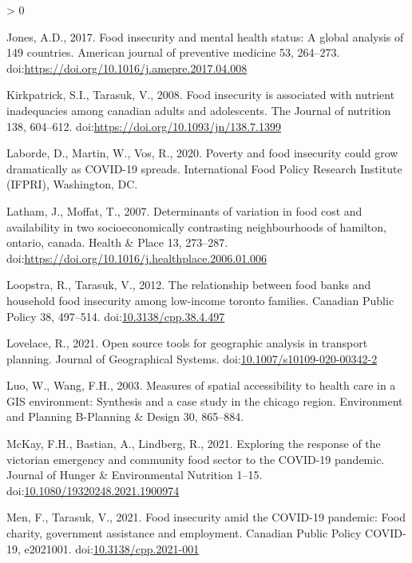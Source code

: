 \documentclass[]{elsarticle} %
\newlength{\cslhangindent}
\newenvironment{CSLReferences}[2] %
 {%
  \setlength{\parindent}{0pt}
  \ifodd #1 \everypar{\setlength{\hangindent}{\cslhangindent}}\ignorespaces\fi
  \ifnum #2 > 0
  \setlength{\parskip}{#2\baselineskip}
  \fi
 }%
 {}
\begin{document}
\begin{CSLReferences}{1}{0}
\leavevmode\hypertarget{ref-jones2017food}{}%
Jones, A.D., 2017. Food insecurity and mental health status: A global
analysis of 149 countries. American journal of preventive medicine 53,
264--273. doi:\url{https://doi.org/10.1016/j.amepre.2017.04.008}

\leavevmode\hypertarget{ref-kirkpatrick2008food}{}%
Kirkpatrick, S.I., Tarasuk, V., 2008. Food insecurity is associated with
nutrient inadequacies among canadian adults and adolescents. The Journal
of nutrition 138, 604--612.
doi:\url{https://doi.org/10.1093/jn/138.7.1399}

\leavevmode\hypertarget{ref-laborde2020poverty}{}%
Laborde, D., Martin, W., Vos, R., 2020. Poverty and food insecurity
could grow dramatically as COVID-19 spreads. International Food Policy
Research Institute (IFPRI), Washington, DC.

\leavevmode\hypertarget{ref-latham2007determinants}{}%
Latham, J., Moffat, T., 2007. Determinants of variation in food cost and
availability in two socioeconomically contrasting neighbourhoods of
hamilton, ontario, canada. Health \& Place 13, 273--287.
doi:\url{https://doi.org/10.1016/j.healthplace.2006.01.006}

\leavevmode\hypertarget{ref-loopstra2012relationship}{}%
Loopstra, R., Tarasuk, V., 2012. The relationship between food banks and
household food insecurity among low-income toronto families. Canadian
Public Policy 38, 497--514.
doi:\href{https://doi.org/10.3138/cpp.38.4.497}{10.3138/cpp.38.4.497}

\leavevmode\hypertarget{ref-lovelace2021open}{}%
Lovelace, R., 2021. Open source tools for geographic analysis in
transport planning. Journal of Geographical Systems.
doi:\href{https://doi.org/10.1007/s10109-020-00342-2}{10.1007/s10109-020-00342-2}

\leavevmode\hypertarget{ref-luo2003measures}{}%
Luo, W., Wang, F.H., 2003. Measures of spatial accessibility to health
care in a GIS environment: Synthesis and a case study in the chicago
region. Environment and Planning B-Planning \& Design 30, 865--884.

\leavevmode\hypertarget{ref-mckay2021exploring}{}%
McKay, F.H., Bastian, A., Lindberg, R., 2021. Exploring the response of
the victorian emergency and community food sector to the COVID-19
pandemic. Journal of Hunger \& Environmental Nutrition 1--15.
doi:\href{https://doi.org/10.1080/19320248.2021.1900974}{10.1080/19320248.2021.1900974}

\leavevmode\hypertarget{ref-men2021food}{}%
Men, F., Tarasuk, V., 2021. Food insecurity amid the COVID-19 pandemic:
Food charity, government assistance and employment. Canadian Public
Policy COVID-19, e2021001.
doi:\href{https://doi.org/10.3138/cpp.2021-001}{10.3138/cpp.2021-001}


\end{CSLReferences}
\end{document}
